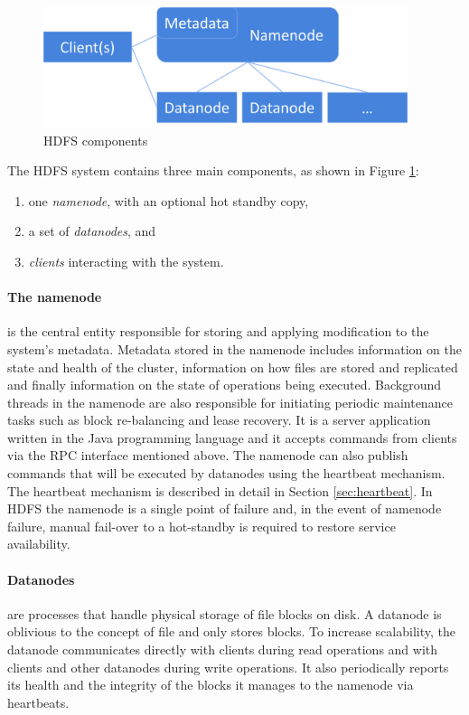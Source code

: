 \begin{figure}[h]
\caption{HDFS components}
\label{fig:hdfs-block-diagram}
\centering
\includegraphics[width=0.95\textwidth]{images/hdfs-block-diagram.png}
\end{figure}

The HDFS system contains three main components, as shown in Figure \ref{fig:hdfs-block-diagram}:
\begin{enumerate}
\item one \emph{namenode}, with an optional hot standby copy,
\item a set of \emph{datanodes}, and
\item \emph{clients} interacting with the system.
\end{enumerate}

\clearpage

\paragraph{The namenode} is the central entity responsible for storing and applying modification to the system's metadata.
Metadata stored in the namenode includes information on the state and health of the cluster, information on how files are stored and replicated and finally information on the state of operations being executed.
Background threads in the namenode are also responsible for initiating periodic maintenance tasks such as block re-balancing and lease recovery.
It is a server application written in the Java programming language and it accepts commands from clients via the RPC interface mentioned above.
The namenode can also publish commands that will be executed by datanodes using the heartbeat mechanism.
The heartbeat mechanism is described in detail in Section \ref{sec:heartbeat}.
In HDFS the namenode is a single point of failure and, in the event of namenode failure, manual fail-over to a hot-standby is required to restore service availability.

\paragraph{Datanodes} are processes that handle physical storage of file blocks on disk.
A datanode is oblivious to the concept of file and only stores blocks.
To increase scalability, the datanode communicates directly with clients during read operations and with clients and other datanodes during write operations.
It also periodically reports its health and the integrity of the blocks it manages to the namenode via heartbeats.

